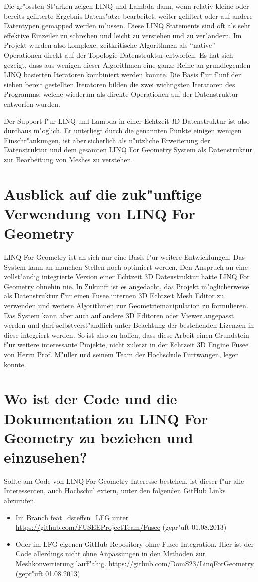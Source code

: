\documentclass[pagesize, paper=a4, fontsize=12pt,titlepage=true, headings=small, headnosepline, abstractoff, liststotoc, nochapterprefix, plainheadsepline]{scrreprt}
\newcommand{\LFG}{LINQ For Geometry}
\newcommand{\LFGS}{LINQ For Geometry }
\begin{document}
Die gr"ossten St"arken zeigen LINQ und Lambda dann, wenn relativ kleine oder bereits gefilterte Ergebnis Datens"atze bearbeitet, weiter gefiltert oder auf andere Datentypen gemapped werden m"ussen. Diese LINQ Statements sind oft als sehr effektive Einzeiler zu schreiben und leicht zu verstehen und zu ver"andern. Im Projekt wurden also komplexe, zeitkritische Algorithmen als "`native"' Operationen direkt auf der Topologie Datenstruktur entworfen. Es hat sich gezeigt, dass aus wenigen dieser Algorithmen eine ganze Reihe an grundlegenden LINQ basierten Iteratoren kombiniert werden konnte. Die Basis f"ur f"unf der sieben bereit gestellten Iteratoren bilden die zwei wichtigsten Iteratoren des Programms, welche wiederum als direkte Operationen auf der Datenstruktur entworfen wurden.


Der Support f"ur LINQ und Lambda in einer Echtzeit 3D Datenstruktur ist also durchaus m"oglich. Er unterliegt durch die genannten Punkte einigen wenigen Einschr"ankungen, ist aber sicherlich als n"utzliche Erweiterung der Datenstruktur und dem gesamten \LFGS System als Datenstruktur zur Bearbeitung von Meshes zu verstehen.
\section{Ausblick auf die zuk"unftige Verwendung von \LFG}
\LFGS ist an sich nur eine Basis f"ur weitere Entwicklungen. Das System kann an manchen Stellen noch optimiert werden. Den Anspruch an eine vollst"andig integrierte Version einer Echtzeit 3D Datenstruktur hatte \LFGS ohnehin nie. In Zukunft ist es angedacht, das Projekt m"oglicherweise als Datenstruktur f"ur einen Fusee internen 3D Echtzeit Mesh Editor zu verwenden und weitere Algorithmen zur Geometriemanipulation zu formulieren. Das System kann aber auch auf andere 3D Editoren oder Viewer angepasst werden und darf selbstverst"andlich unter Beachtung der bestehenden Lizenzen in diese integriert werden. So ist also zu hoffen, dass diese Arbeit einen Grundstein f"ur weitere interessante Projekte, nicht zuletzt in der Echtzeit 3D Engine Fusee von Herrn Prof. M"uller und seinem Team der Hochschule Furtwangen, legen konnte.

\newpage
\section {Wo ist der Code und die Dokumentation zu \LFGS zu beziehen und einzusehen?}
	Sollte am Code von \LFGS Interesse bestehen, ist dieser f"ur alle Interessenten, auch Hochschul extern, unter den folgenden GitHub Links abzurufen.
\begin{itemize}
\item Im Branch feat\_dsteffen\_LFG unter \url{https://github.com/FUSEEProjectTeam/Fusee} (gepr"uft 01.08.2013)
\item Oder im LFG eigenen GitHub Repository ohne Fusee Integration. Hier ist der Code allerdings nicht ohne Anpassungen in den Methoden zur Meshkonvertierung lauff"ahig. \url{https://github.com/DomS23/LinqForGeometry} (gepr"uft 01.08.2013)
\end{itemize}
\end{document}
